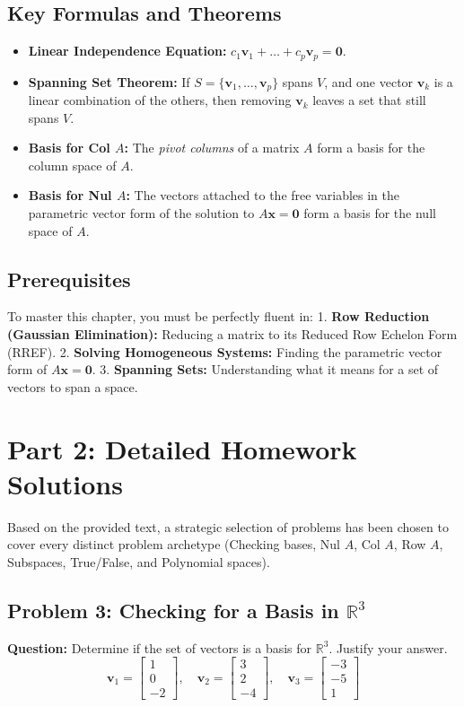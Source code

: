 \documentclass[12pt]{article}
\begin{document}
\subsection{Key Formulas and Theorems}
\begin{itemize}
    \item \textbf{Linear Independence Equation:} $c_1\mathbf{v}_1 + \dots + c_p\mathbf{v}_p = \mathbf{0}$.
    \item \textbf{Spanning Set Theorem:} If $S = \{\mathbf{v}_1, \dots, \mathbf{v}_p\}$ spans $V$, and one vector $\mathbf{v}_k$ is a linear combination of the others, then removing $\mathbf{v}_k$ leaves a set that still spans $V$.
    \item \textbf{Basis for Col $A$:} The \textit{pivot columns} of a matrix $A$ form a basis for the column space of $A$.
    \item \textbf{Basis for Nul $A$:} The vectors attached to the free variables in the parametric vector form of the solution to $A\mathbf{x} = \mathbf{0}$ form a basis for the null space of $A$.
\end{itemize}

\subsection{Prerequisites}
To master this chapter, you must be perfectly fluent in:
1. \textbf{Row Reduction (Gaussian Elimination):} Reducing a matrix to its Reduced Row Echelon Form (RREF).
2. \textbf{Solving Homogeneous Systems:} Finding the parametric vector form of $A\mathbf{x} = \mathbf{0}$.
3. \textbf{Spanning Sets:} Understanding what it means for a set of vectors to span a space.

\newpage
\section{Part 2: Detailed Homework Solutions}

Based on the provided text, a strategic selection of problems has been chosen to cover every distinct problem archetype (Checking bases, Nul $A$, Col $A$, Row $A$, Subspaces, True/False, and Polynomial spaces).

\subsection{Problem 3: Checking for a Basis in $\mathbb{R}^3$}
\textbf{Question:} Determine if the set of vectors is a basis for $\mathbb{R}^3$. Justify your answer.
\[ \mathbf{v}_1 = \begin{bmatrix} 1 \\ 0 \\ -2 \end{bmatrix}, \quad \mathbf{v}_2 = \begin{bmatrix} 3 \\ 2 \\ -4 \end{bmatrix}, \quad \mathbf{v}_3 = \begin{bmatrix} -3 \\ -5 \\ 1 \end{bmatrix} \]
\end{document}
